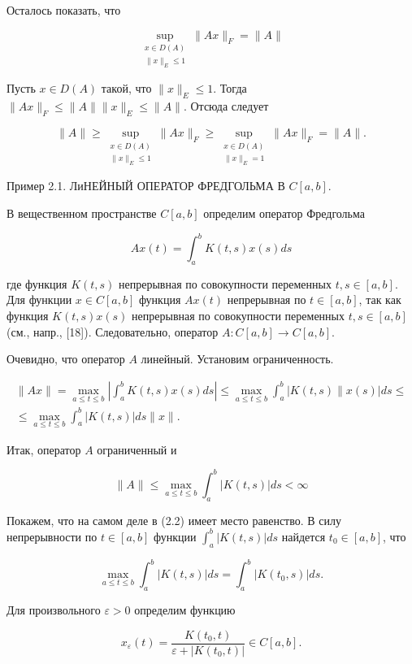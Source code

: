 Осталось показать, что

$$
	\sup _{\substack{x \in D(A) \\\|x\|_{E} \leq 1}}\|A x\|_{F}=\|A\|
$$

Пусть $x \in D(A)$ такой, что $\|x\|_{E} \leq 1$. Тогда $\|A x\|_{F} \leq\|A\|\|x\|_{E} \leq\|A\|$. Отсюда следует

$$
	\|A\| \geq \sup _{\substack{x \in D(A) \\\|x\|_{E} \leq 1}}\|A x\|_{F} \geq \sup _{\substack{x \in D(A) \\\|x\|_{E}=1}}\|A x\|_{F}=\|A\| .
$$

Пример 2.1. ЛиНЕЙНЫЙ ОПЕРАТОР ФРЕДГОЛЬМА В $C[a, b]$.

В вещественном пространстве $C[a, b]$ определим оператор Фредгольма

$$
	A x(t)=\int_{a}^{b} K(t, s) x(s) d s
$$

где функция $K(t, s)$ непрерывная по совокупности переменных $t, s \in[a, b]$. Для функции $x \in C[a, b]$ функция $A x(t)$ непрерывная по $t \in[a, b]$, так как функция $K(t, s) x(s)$ непрерывная по совокупности переменных $t, s \in[a, b]$ (см., напр., [18]). Следовательно, оператор $A: C[a, b] \rightarrow C[a, b]$.

Очевидно, что оператор $A$ линейный. Установим ограниченность.

$$
	\begin{gathered}
		\|A x\|=\max _{a \leq t \leq b}\left|\int_{a}^{b} K(t, s) x(s) d s\right| \leq \max _{a \leq t \leq b} \int_{a}^{b}|K(t, s) \| x(s)| d s \leq \\
		\leq \max _{a \leq t \leq b} \int_{a}^{b}|K(t, s)| d s\|x\| .
	\end{gathered}
$$

Итак, оператор $A$ ограниченный и

$$
	\|A\| \leq \max _{a \leq t \leq b} \int_{a}^{b}|K(t, s)| d s<\infty
$$

Покажем, что на самом деле в (2.2) имеет место равенство. В силу непрерывности по $t \in[a, b]$ функции $\int_{a}^{b}|K(t, s)| d s$ найдется $t_{0} \in[a, b]$, что

$$
	\max _{a \leq t \leq b} \int_{a}^{b}|K(t, s)| d s=\int_{a}^{b}\left|K\left(t_{0}, s\right)\right| d s .
$$

Для произвольного $\varepsilon>0$ определим функцию

$$
	x_{\varepsilon}(t)=\frac{K\left(t_{0}, t\right)}{\varepsilon+\left|K\left(t_{0}, t\right)\right|} \in C[a, b] .
$$

